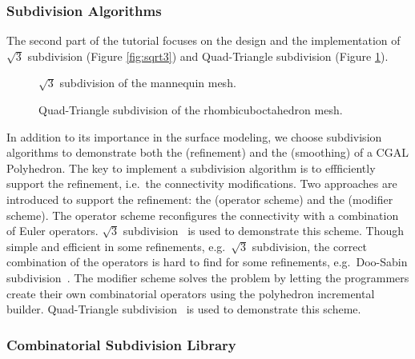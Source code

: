 \documentclass[letter,twocolumn]{article}
\begin{document}
\subsubsection*{Subdivision Algorithms}

The second part of the tutorial focuses on the design and the
implementation of $\sqrt{3}$ subdivision (Figure \ref{fig:sqrt3}) 
and Quad-Triangle subdivision (Figure \ref{fig:quad-triangle}).  

\begin{figure}[htb]
    \caption{$\sqrt{3}$ subdivision of the mannequin mesh.}
    \label{fig:sqrt3}
    \vspace{0.5cm}
    \caption{Quad-Triangle subdivision of the rhombicuboctahedron mesh.}
    \label{fig:quad-triangle}
\end{figure}

In addition to its importance in the surface modeling, we 
choose subdivision algorithms to demonstrate both the 
 (refinement) and the
 (smoothing) of a
CGAL Polyhedron. 
The key to implement a subdivision algorithm is to effficiently support
the refinement, i.e.\ the connectivity modifications. Two approaches
are introduced to support the refinement: the  (operator scheme) and
the  (modifier scheme). 
The operator scheme reconfigures the connectivity with a 
combination of Euler operators. $\sqrt{3}$ subdivision~\cite{sqrt3} is
used to demonstrate this scheme. Though simple and efficient in some
refinements, e.g.\ $\sqrt{3}$ subdivision, the correct combination of
the operators is hard to find for some refinements, e.g.\ Doo-Sabin
subdivision~\cite{ds}. The modifier scheme solves the problem by
letting the programmers create their own combinatorial operators 
using the polyhedron incremental builder. Quad-Triangle
subdivision~\cite{qts,l-pg-03} is used to demonstrate this scheme.


\subsubsection*{Combinatorial Subdivision Library}
\end{document}

